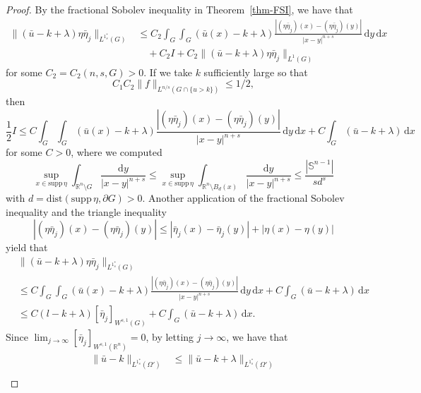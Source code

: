\documentclass{amsart}
\theoremstyle{plain}
\theoremstyle{definition}
\numberwithin{equation}{section}
\begin{document}
\begin{proof}
By the fractional Sobolev inequality in Theorem~\ref{thm-FSI}, we have that
\begin{align*}
\|(\bar{u}-k+\lambda)\eta\bar{\eta}_j\|_{L^{1^{\ast}_s}(G)}
&\leq C_2 \int_{G} \int_{G} (\bar{u}(x)-k+\lambda) \frac{|(\eta\bar{\eta}_j)(x)-(\eta\bar{\eta}_j)(y)|}{|x-y|^{n+s}} \,\mathrm{d}y \,\mathrm{d}x \\
&\quad + C_2 I + C_2 \|(\bar{u}-k+\lambda)\eta\bar{\eta}_j\|_{L^1(G)}
\end{align*}
for some $C_2=C_2(n, s, G)>0$. If we take $k$ sufficiently large so that
\begin{equation}\label{eq-k}
C_1C_2 \|f\|_{L^{n/s}(G \cap \{u>k\})} \leq 1/2,
\end{equation}
then
\begin{equation*}
\frac{1}{2} I \leq C \int_{G} \int_{G} (\bar{u}(x)-k+\lambda) \frac{|(\eta\bar{\eta}_j)(x)-(\eta\bar{\eta}_j)(y)|}{|x-y|^{n+s}} \,\mathrm{d}y \,\mathrm{d}x + C \int_G (\bar{u}-k+\lambda) \,\mathrm{d}x
\end{equation*}
for some $C>0$, where we computed
\begin{equation*}
\sup_{x \in \mathrm{supp}\,\eta} \int_{\mathbb{R}^n \setminus G} \frac{\mathrm{d}y}{|x-y|^{n+s}} \leq \sup_{x \in \mathrm{supp}\,\eta} \int_{\mathbb{R}^n \setminus B_d(x)} \frac{\mathrm{d}y}{|x-y|^{n+s}} \leq \frac{|\mathbb{S}^{n-1}|}{s d^s}
\end{equation*}
with $d=\mathrm{dist}(\mathrm{supp}\,\eta, \partial G)>0$. Another application of the fractional Sobolev inequality and the triangle inequality
\begin{equation*}
|(\eta\bar{\eta}_j)(x)-(\eta\bar{\eta}_j)(y)| \leq |\bar{\eta}_j(x)-\bar{\eta}_j(y)| + |\eta(x)-\eta(y)|
\end{equation*}
yield that
\begin{align*}
&\|(\bar{u}-k+\lambda)\eta\bar{\eta}_j\|_{L^{1^{\ast}_s}(G)} \\
&\leq C \int_{G} \int_{G} (\bar{u}(x)-k+\lambda) \frac{|(\eta\bar{\eta}_j)(x)-(\eta\bar{\eta}_j)(y)|}{|x-y|^{n+s}} \,\mathrm{d}y \,\mathrm{d}x + C \int_{G} (\bar{u}-k+\lambda) \,\mathrm{d}x \\
&\leq C (l-k+\lambda) [\bar{\eta}_j]_{W^{s, 1}(G)} + C \int_{G} (\bar{u}-k+\lambda) \,\mathrm{d}x.
\end{align*}
Since $\lim_{j\to \infty} [\bar{\eta}_j]_{W^{s,1}(\mathbb{R}^n)} = 0$, by letting $j \to \infty$, we have that
\begin{align*}
\|\bar{u}-k\|_{L^{1^{\ast}_s}(\Omega')}
&\leq \|\bar{u}-k+\lambda\|_{L^{1^{\ast}_s}(\Omega')} \\

\end{align*}
\end{proof}
\end{document}
